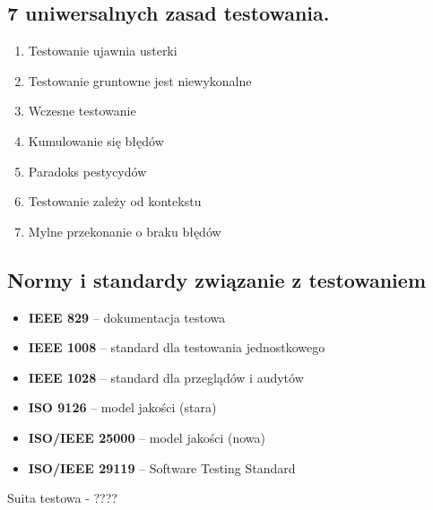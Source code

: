 \documentclass[../main.tex]{subfiles}
\begin{document}
    \subsection{7 uniwersalnych zasad testowania.}
    \begin{enumerate}
        \item Testowanie ujawnia usterki
        \item Testowanie gruntowne jest niewykonalne
        \item Wczesne testowanie
        \item Kumulowanie się błędów
        \item Paradoks pestycydów
        \item Testowanie zależy od kontekstu
        \item Mylne przekonanie o braku błędów
    \end{enumerate}

    \subsection{Normy i standardy związanie z testowaniem}
    \begin{itemize}
        \item \textbf{IEEE 829} – dokumentacja testowa
        \item \textbf{IEEE 1008} – standard dla testowania jednostkowego
        \item \textbf{IEEE 1028} – standard dla przeglądów i audytów
        \item \textbf{ISO 9126} – model jakości (stara)
        \item \textbf{ISO/IEEE 25000} – model jakości (nowa)
        \item \textbf{ISO/IEEE 29119} – Software Testing Standard
    \end{itemize}


    Suita testowa - ????
\end{document}
